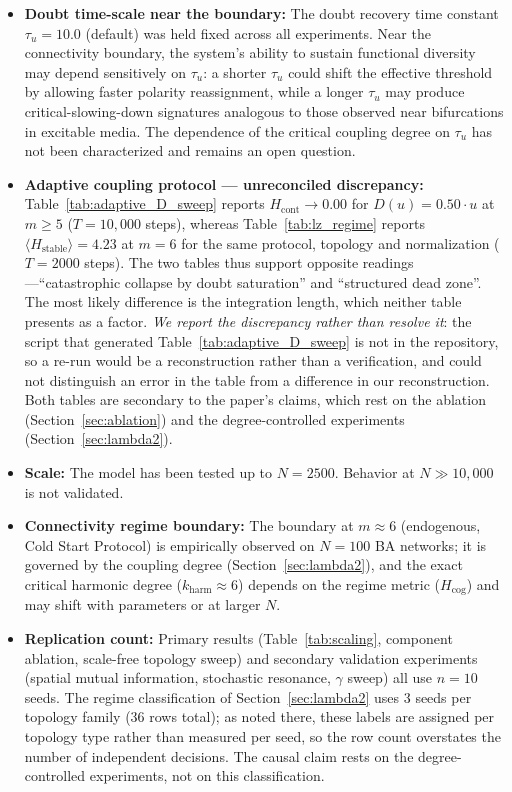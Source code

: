﻿\documentclass[11pt]{article}
\begin{document}
\begin{itemize}
\item \textbf{Doubt time-scale near the boundary:} The doubt recovery time constant $\tau_u = 10.0$ (default) was held fixed across all experiments. Near the connectivity boundary, the system's ability to sustain functional diversity may depend sensitively on $\tau_u$: a shorter $\tau_u$ could shift the effective threshold by allowing faster polarity reassignment, while a longer $\tau_u$ may produce critical-slowing-down signatures analogous to those observed near bifurcations in excitable media. The dependence of the critical coupling degree on $\tau_u$ has not been characterized and remains an open question.
\item \textbf{Adaptive coupling protocol --- unreconciled discrepancy:} Table~\ref{tab:adaptive_D_sweep} reports $H_{\text{cont}} \to 0.00$ for $D(u) = 0.50 \cdot u$ at $m \geq 5$ ($T = 10{,}000$ steps), whereas Table~\ref{tab:lz_regime} reports $\langle H_{\mathrm{stable}}\rangle = 4.23$ at $m = 6$ for the same protocol, topology and normalization ($T = 2000$ steps). The two tables thus support opposite readings---``catastrophic collapse by doubt saturation'' and ``structured dead zone''. The most likely difference is the integration length, which neither table presents as a factor. \emph{We report the discrepancy rather than resolve it}: the script that generated Table~\ref{tab:adaptive_D_sweep} is not in the repository, so a re-run would be a reconstruction rather than a verification, and could not distinguish an error in the table from a difference in our reconstruction. Both tables are secondary to the paper's claims, which rest on the ablation (Section~\ref{sec:ablation}) and the degree-controlled experiments (Section~\ref{sec:lambda2}).
\item \textbf{Scale:} The model has been tested up to $N = 2500$. Behavior at $N \gg 10{,}000$ is not validated.
\item \textbf{Connectivity regime boundary:} The boundary at $m \approx 6$ (endogenous, Cold Start Protocol) is empirically observed on $N = 100$ BA networks; it is governed by the coupling degree (Section~\ref{sec:lambda2}), and the exact critical harmonic degree ($k_{\mathrm{harm}} \approx 6$) depends on the regime metric ($H_{\mathrm{cog}}$) and may shift with parameters or at larger $N$.
\item \textbf{Replication count:} Primary results (Table~\ref{tab:scaling}, component ablation, scale-free topology sweep) and secondary validation experiments (spatial mutual information, stochastic resonance, $\gamma$ sweep) all use $n = 10$ seeds. The regime classification of Section~\ref{sec:lambda2} uses 3 seeds per topology family (36 rows total); as noted there, these labels are assigned per topology type rather than measured per seed, so the row count overstates the number of independent decisions. The causal claim rests on the degree-controlled experiments, not on this classification.
\end{itemize}
\end{document}
